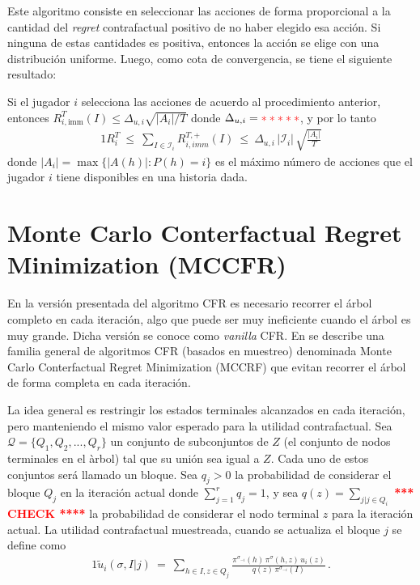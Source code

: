 Este algoritmo consiste en seleccionar las acciones de forma proporcional a la cantidad del \textit{regret} contrafactual positivo de no haber elegido esa acción. Si ninguna de estas cantidades es positiva, entonces la acción se elige con una distribución uniforme. Luego, como cota de convergencia, se tiene el siguiente resultado:

\begin{theorem}[\textcolor{red}{\bf **** REF ****}]
Si el jugador $i$ selecciona las acciones de acuerdo al procedimiento anterior, entonces $R^T_{i, \text{imm}}(I) \leq \Delta_{u, i} \sqrt{|A_i|/T}$ donde $\Delta_{u,i} = \textcolor{red}{\bf *****}$, y por lo tanto
\begin{alignat}{1}
R_i^T\ \leq\ \sum_{I\in\mathcal{I}_i} R^{T,+}_{i,imm}(I) \ 
        \leq\ \Delta_{u,i}\,|\mathcal{I}_i|\,\sqrt{\frac{|A_i|}{T}}
\end{alignat}
donde $|A_i| = \max \{ |A(h)| : P(h) = i \}$ es el máximo número de acciones que el jugador $i$ tiene disponibles en una historia dada.
\end{theorem}


\section{Monte Carlo Conterfactual Regret Minimization (MCCFR)}

En la versión presentada del algoritmo CFR es necesario recorrer el árbol completo en cada iteración, algo que puede ser muy ineficiente cuando el árbol es muy grande. Dicha versión se conoce como \textit{vanilla} CFR. En \cite{bib:montecarlo-cfr} se describe una familia general de algoritmos CFR (basados en muestreo) denominada Monte Carlo Conterfactual Regret Minimization (MCCRF) que evitan recorrer el árbol de forma completa en cada iteración.

La idea general es restringir los estados terminales alcanzados en cada iteración, pero manteniendo el mismo valor esperado para la utilidad contrafactual. Sea $\mathcal{Q} = \{Q_1, Q_2, ..., Q_r\}$ un conjunto de subconjuntos de $Z$ (el conjunto de nodos terminales en el àrbol) tal que su unión sea igual a $Z$. Cada uno de estos conjuntos será llamado un bloque. Sea $q_j > 0$ la probabilidad de considerar el bloque $Q_j$ en la iteración actual donde $\sum_{j = 1}^r {q_j} = 1$, y sea $q(z) = \sum_{j | j \in Q_i}$ \textcolor{red}{\bf **** CHECK ****} la probabilidad de considerar el nodo terminal $z$ para la iteración actual. La utilidad contrafactual muestreada, cuando se actualiza el bloque $j$ se define como
\begin{alignat}{1}
\tilde{u}_i(\sigma, I | j)\ =\ \sum_{h \in I, z \in Q_j} \frac{\pi^{\sigma_{-i}}(h)\,\pi^{\sigma}(h, z)\, u_i(z)}{q(z)\,\pi^{\sigma_{-i}}(I)} \,.
\end{alignat}

